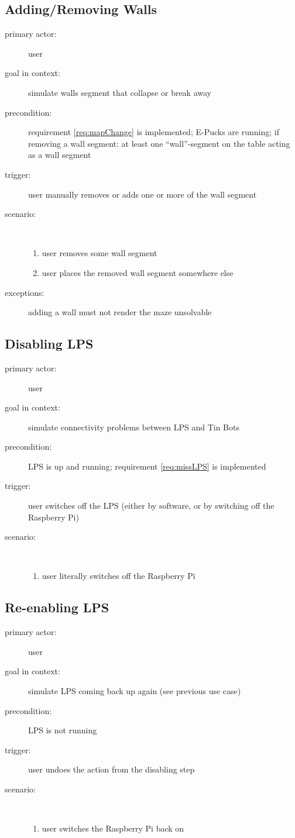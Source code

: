 \documentclass[a4paper,parskip,headheight=38pt]{scrartcl} %
\begin{document}
\subsection{Adding/Removing Walls}
\begin{description}
\item[primary actor:] user
\item[goal in context:] simulate walls segment that collapse or break away
\item[precondition:] requirement \ref{req:mapChange} is implemented; E-Pucks are running; if removing a wall segment: at least one \enquote{wall}-segment on the table acting as a wall segment
\item[trigger:] user manually removes or adds one or more of the wall segment
\item[scenario:] \ 
\begin{enumerate}
	\item user removes some wall segment
	\item user places the removed wall segment somewhere else
\end{enumerate}
\item[exceptions:] adding a wall must not render the maze unsolvable
\end{description}

\subsection{Disabling LPS}
\begin{description}
\item[primary actor:] user
\item[goal in context:] simulate connectivity problems between LPS and Tin Bots
\item[precondition:] LPS is up and running; requirement \ref{req:missLPS} is implemented
\item[trigger:] user switches off the LPS (either by software, or by switching off the Raspberry Pi)
\item[scenario:] \ 
\begin{enumerate}
	\item user literally switches off the Raspberry Pi
\end{enumerate}
\end{description}

\subsection{Re-enabling LPS}
\begin{description}
\item[primary actor:] user
\item[goal in context:] simulate LPS coming back up again (see previous use case)
\item[precondition:] LPS is not running
\item[trigger:] user undoes the action from the disabling step
\item[scenario:]\
\begin{enumerate}
	\item user switches the Raspberry Pi back on
\end{enumerate}
\end{description}
\end{document}
